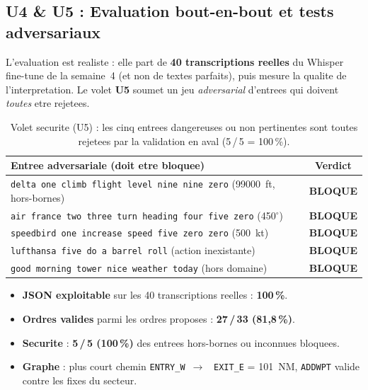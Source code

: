 \documentclass[11pt,a4paper]{article}
\begin{document}
\subsection{U4 \& U5 : Evaluation bout-en-bout et tests adversariaux}

L'evaluation est realiste : elle part de \textbf{40 transcriptions reelles} du
Whisper fine-tune de la semaine~4 (et non de textes parfaits), puis mesure la
qualite de l'interpretation. Le volet \textbf{U5} soumet un jeu \emph{adversarial}
d'entrees qui doivent \emph{toutes} etre rejetees.

\begin{table}[h]
\centering
\small
\begin{tabular}{>{\raggedright}p{8.6cm} c}
\toprule
\rowcolor{lightgray}\textbf{Entree adversariale (doit etre bloquee)} & \textbf{Verdict}\\
\midrule
\texttt{delta one climb flight level nine nine zero} (99000~ft, hors-bornes) & \textcolor{atcgreen}{\textbf{BLOQUE}}\\
\texttt{air france two three turn heading four five zero} (450$^\circ$) & \textcolor{atcgreen}{\textbf{BLOQUE}}\\
\texttt{speedbird one increase speed five zero zero} (500~kt) & \textcolor{atcgreen}{\textbf{BLOQUE}}\\
\texttt{lufthansa five do a barrel roll} (action inexistante) & \textcolor{atcgreen}{\textbf{BLOQUE}}\\
\texttt{good morning tower nice weather today} (hors domaine) & \textcolor{atcgreen}{\textbf{BLOQUE}}\\
\bottomrule
\end{tabular}
\caption{Volet securite (U5) : les cinq entrees dangereuses ou non pertinentes sont
toutes rejetees par la validation en aval (5\,/\,5 = 100\,\%).}
\end{table}

\begin{resbox}
\begin{itemize}
  \item \textbf{JSON exploitable} sur les 40 transcriptions reelles : \textbf{100\,\%}.
  \item \textbf{Ordres valides} parmi les ordres proposes : \textbf{27\,/\,33
  (81,8\,\%)}.
  \item \textbf{Securite} : \textbf{5\,/\,5 (100\,\%)} des entrees hors-bornes ou
  inconnues bloquees.
  \item \textbf{Graphe} : plus court chemin \texttt{ENTRY\_W}~$\rightarrow$~%
  \texttt{EXIT\_E} = 101~NM, \texttt{ADDWPT} valide contre les fixes du secteur.
\end{itemize}
\end{resbox}
\end{document}
